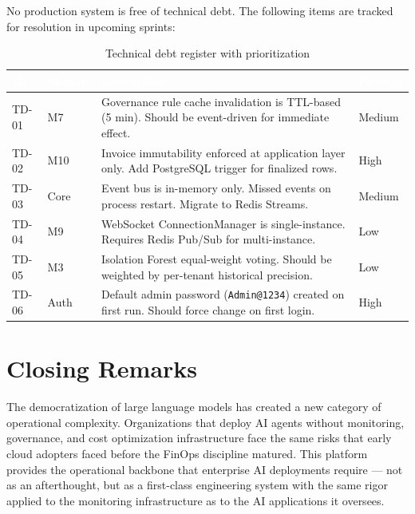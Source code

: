 \documentclass[12pt,a4paper,twoside]{report}
\begin{document}
No production system is free of technical debt. The following items are tracked for resolution in upcoming sprints:

\begin{table}[H]
\centering
\small
\begin{tabularx}{\textwidth}{|l|l|X|l|}
\hline
\rowcolor{tabheader}
\textcolor{white}{\textbf{ID}} &
\textcolor{white}{\textbf{Module}} &
\textcolor{white}{\textbf{Description}} &
\textcolor{white}{\textbf{Priority}} \\
\hline
TD-01 & M7 & Governance rule cache invalidation is TTL-based (5 min). Should be event-driven for immediate effect. & Medium \\
\hline
TD-02 & M10 & Invoice immutability enforced at application layer only. Add PostgreSQL trigger for finalized rows. & High \\
\hline
TD-03 & Core & Event bus is in-memory only. Missed events on process restart. Migrate to Redis Streams. & Medium \\
\hline
TD-04 & M9 & WebSocket ConnectionManager is single-instance. Requires Redis Pub/Sub for multi-instance. & Low \\
\hline
TD-05 & M3 & Isolation Forest equal-weight voting. Should be weighted by per-tenant historical precision. & Low \\
\hline
TD-06 & Auth & Default admin password (\texttt{Admin@1234}) created on first run. Should force change on first login. & High \\
\hline
\end{tabularx}
\caption{Technical debt register with prioritization}
\end{table}

\section{Closing Remarks}

The democratization of large language models has created a new category of operational complexity. Organizations that deploy AI agents without monitoring, governance, and cost optimization infrastructure face the same risks that early cloud adopters faced before the FinOps discipline matured. This platform provides the operational backbone that enterprise AI deployments require — not as an afterthought, but as a first-class engineering system with the same rigor applied to the monitoring infrastructure as to the AI applications it oversees.

\vspace{2cm}
\end{document}
